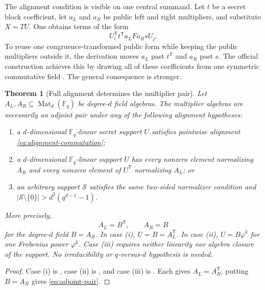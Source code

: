 \documentclass[11pt]{article}
\newtheorem{theorem}{Theorem}[section]
\newcommand{\F}{\mathbb F}
\newcommand{\Mat}{\operatorname{Mat}}
\newcommand{\transpose}{\mathsf T}
\begin{document}
The alignment condition is visible on one central summand.  Let $t$ be a
secret block coefficient, let $a_L$ and $a_R$ be public left and right
multipliers, and substitute $X=TU$.  One obtains terms of the form
\[
 U_i^\transpose t^\transpose a_L F a_R sU_j.
\]
To reuse one congruence-transformed public form while keeping the public
multipliers outside it, the derivation moves $a_L$ past $t^\transpose$ and
$a_R$ past $s$.  The official construction achieves this by drawing all of
these coefficients from one symmetric commutative field
\cite{SNOVA23}.  The general consequence is stronger.

\begin{theorem}[Full alignment determines the multiplier pair]
\label{thm:alignment-multiplier-pair}
Let $A_L,A_R\subseteq\Mat_d(\F_q)$ be degree-$d$ field algebras.
The multiplier algebras are necessarily an adjoint pair under any of the
following alignment hypotheses:
\begin{enumerate}[label=(\roman*)]
\item a $d$-dimensional $\F_q$-linear secret support $U$ satisfies
      pointwise alignment \eqref{eq:alignment-commutation};
\item a $d$-dimensional $\F_q$-linear support $U$ has every nonzero
      element normalizing $A_R$ and every nonzero element of $U^\transpose$
      normalizing $A_L$; or
\item an arbitrary support $\mathcal S$ satisfies the same two-sided
      normalizer condition and
      $|\mathcal S\setminus\{0\}|>d^2(q^{d-1}-1)$.
\end{enumerate}
More precisely,
\begin{equation}
  A_L=B^\transpose,
  \qquad
  A_R=B                                             \label{eq:adjoint-pair}
\end{equation}
for the degree-$d$ field $B=A_R$.  In case (i),
$U=B=A_L^\transpose$.  In case (ii),
$U=B\varphi^k$ for one Frobenius power $\varphi^k$.  Case (iii) requires
neither linearity nor algebra closure of the support.  No irreducibility or
$q$-versus-$d$ hypothesis is needed.
\end{theorem}

\begin{proof}
Case (i) is , case (ii) is
, and case (iii) is
.  Each gives
$A_L=A_R^\transpose$; putting $B=A_R$ gives \eqref{eq:adjoint-pair}.
\end{proof}
\end{document}
